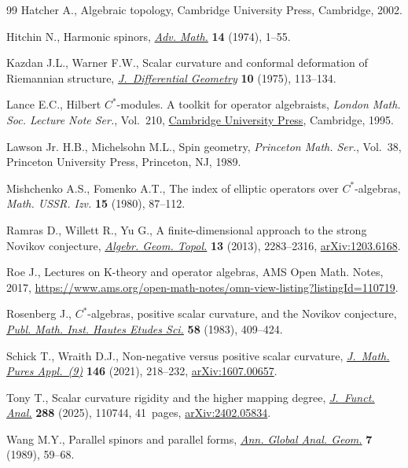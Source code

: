 \documentclass[pdftex]{sigma}
\numberwithin{equation}{section}
\begin{document}
\begin{thebibliography}{99}
Hatcher A., Algebraic topology, Cambridge University Press, Cambridge, 2002.

Hitchin N., Harmonic spinors,
 \href{https://doi.org/10.1016/0001-8708(74)90021-8}{\textit{Adv. Math.}}
 \textbf{14} (1974), 1--55.

Kazdan J.L., Warner F.W., Scalar curvature and conformal deformation of
 {R}iemannian structure,
 \href{https://doi.org/10.4310/jdg/1214432678}{\textit{J.~Differential
 Geometry}} \textbf{10} (1975), 113--134.

Lance E.C., Hilbert {$C^*$}-modules. A toolkit for operator algebraists,
 \textit{London Math. Soc. Lecture Note Ser.}, Vol.~210,
 \href{https://doi.org/10.1017/CBO9780511526206}{Cambridge University Press},
 Cambridge, 1995.

Lawson Jr. H.B., Michelsohn M.L., Spin geometry, \textit{Princeton Math. Ser.},
 Vol.~38, Princeton University Press, Princeton, NJ, 1989.

Mishchenko A.S., Fomenko A.T., The index of elliptic operators over {$C^{\ast}
 $}-algebras, \textit{Math. USSR. Izv.} \textbf{15} (1980), 87--112.

Ramras D., Willett R., Yu G., A finite-dimensional approach to the strong
 {N}ovikov conjecture,
 \href{https://doi.org/10.2140/agt.2013.13.2283}{\textit{Algebr. Geom.
 Topol.}} \textbf{13} (2013), 2283--2316,
 \href{http://arxiv.org/abs/1203.6168}{arXiv:1203.6168}.

Roe J., Lectures on K-theory and operator algebras, {AMS} Open Math. Notes,
 2017,
 \url{https://www.ams.org/open-math-notes/omn-view-listing?listingId=110719}.

Rosenberg J., {$C^{\ast} $}-algebras, positive scalar curvature, and the
 {N}ovikov conjecture, \href{https://doi.org/10.1007/BF02953775}{\textit{Publ.
 Math. Inst. Hautes Etudes Sci.}} \textbf{58} (1983), 409--424.

Schick T., Wraith D.J., Non-negative versus positive scalar curvature,
 \href{https://doi.org/10.1016/j.matpur.2020.09.010}{\textit{J.~Math. Pures
 Appl.~(9)}} \textbf{146} (2021), 218--232,
 \href{http://arxiv.org/abs/1607.00657}{arXiv:1607.00657}.

Tony T., Scalar curvature rigidity and the higher mapping degree,
 \href{https://doi.org/10.1016/j.jfa.2024.110744}{\textit{J.~Funct. Anal.}}
 \textbf{288} (2025), 110744, 41~pages,
 \href{http://arxiv.org/abs/2402.05834}{arXiv:2402.05834}.

Wang M.Y., Parallel spinors and parallel forms,
 \href{https://doi.org/10.1007/BF00137402}{\textit{Ann. Global Anal. Geom.}}
 \textbf{7} (1989), 59--68.

\end{thebibliography}\LastPageEnding
\end{document}
